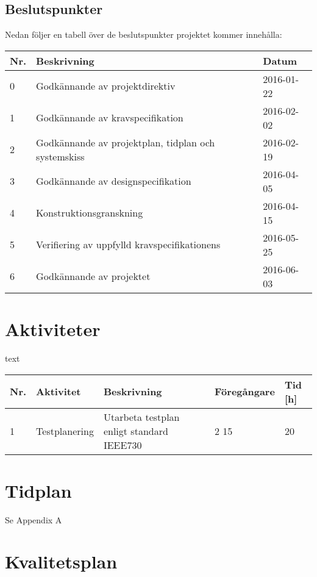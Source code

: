 \documentclass[11pt]{article}
\begin{document}
\begin{flushleft}
\begin{longtable}{| p{.05\linewidth} | p{.7\linewidth} | p{.15\linewidth} |}
\end{longtable}

\subsection{Beslutspunkter}
Nedan följer en tabell över de beslutspunkter projektet kommer innehålla:

\begin{longtable}{| p{.05\linewidth} | p{.7\linewidth} | p{.15\linewidth} |} \hline
\textbf{Nr.} & \textbf{Beskrivning} & \textbf{Datum} \\ \hline
0 & Godkännande av projektdirektiv & 2016-01-22 \\ \hline
1 & Godkännande av kravspecifikation & 2016-02-02 \\ \hline
2 & Godkännande av projektplan, tidplan och systemskiss & 2016-02-19 \\ \hline
3 & Godkännande av designspecifikation & 2016-04-05 \\ \hline
4 & Konstruktionsgranskning & 2016-04-15 \\ \hline
5 & Verifiering av uppfylld kravspecifikationens & 2016-05-25 \\ \hline
6 & Godkännande av projektet & 2016-06-03 \\ \hline

\end{longtable}

\pagebreak
\section{Aktiviteter}
text

\begin{longtable}{| p{.05\linewidth} | p{.15\linewidth} | p{.4\linewidth} | p{.15\linewidth} | p{.1\linewidth} |} \hline
\textbf{Nr.} & \textbf{Aktivitet} & \textbf{Beskrivning} & \textbf{Föregångare} & \textbf{Tid [h]} \\ \hline
1 & Testplanering & Utarbeta testplan enligt standard IEEE730 & 2 15 & 20 \\ \hline

\end{longtable}

\pagebreak
\section{Tidplan}
Se Appendix A

\pagebreak
\section{Kvalitetsplan}

\end{flushleft}
\end{document}
